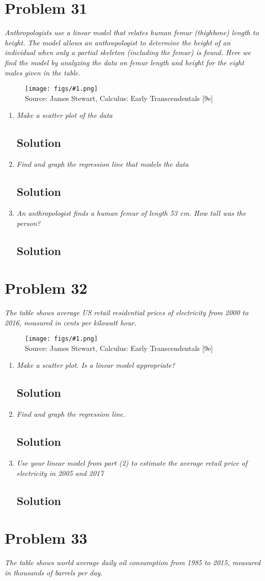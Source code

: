 \documentclass[11pt]{article}
\newcommand{\soln}{\subsection*}
\newcommand{\qn}{\textit}
\newcommand{\imagesource}[1]{{\footnotesize Source: #1}}
\newcommand{\imgqn}[1]{
	\begin{figure}[H]
		\centering
		\texttt{[image: figs/\#1.png]}\\
		\imagesource{James Stewart, Calculus: Early Transcendentals [9e]}
	\end{figure}
}
\begin{document}
\section*{Problem 31}

\qn{Anthropologists use a linear model that relates human femur (thighbone) length to height. The model allows an anthropologist to determine the height of an individual when only a partial skeleton (including the femur) is found. Here we find the model by analyzing the data on femur length and height for the eight males given in the table.}

\imgqn{1.2.31}

\begin{enumerate}
	\item \qn{Make a scatter plot of the data}
	\soln{Solution}
	
	\item \qn{Find and graph the regression line that models the data}
	\soln{Solution}
	
	\item \qn{An anthropologist finds a human femur of length 53 cm. How tall was the person?}
	\soln{Solution}
\end{enumerate}

\section*{Problem 32}

\qn{The table shows average US retail residential prices of electricity from 2000 to 2016, measured in cents per kilowatt hour.}

\imgqn{1.2.32}

\begin{enumerate}
	\item \qn{Make a scatter plot. Is a linear model appropriate?}
	\soln{Solution}
	
	\item \qn{Find and graph the regression line.}
	\soln{Solution}
	
	\item \qn{Use your linear model from part (2) to estimate the average retail price of electricity in 2005 and 2017}
	\soln{Solution}
\end{enumerate}

\section*{Problem 33}

\qn{The table shows world average daily oil consumption from 1985 to 2015, measured in thousands of barrels per day.}
\end{document}
